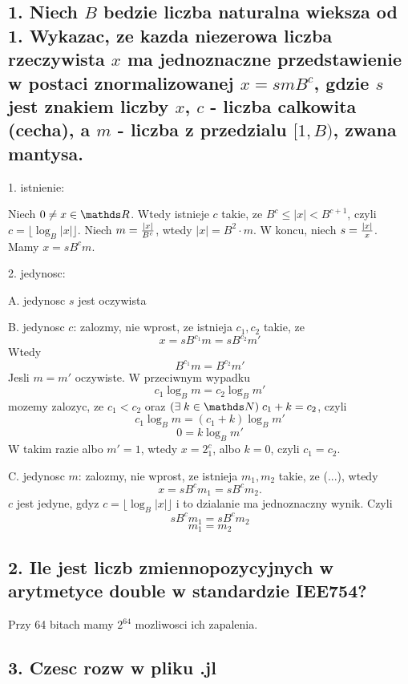 \documentclass{article}[13pt]
\begin{document}
    \subsection*{1. Niech $B$ bedzie liczba naturalna wieksza od 1. Wykazac, ze kazda niezerowa liczba rzeczywista $x$ ma jednoznaczne przedstawienie w postaci znormalizowanej $x=smB^c$, gdzie $s$ jest znakiem liczby $x$, $c$ - liczba calkowita (cecha), a $m$ - liczba z przedzialu $[1, B)$, zwana mantysa.}

    1. istnienie:
    \medskip

    Niech $0\neq x\in\R$. Wtedy istnieje $c$ takie, ze $B^c\leq |x| < B^{c+1}$, czyli $c=\lfloor\log_B |x|\rfloor$. Niech $m={|x|\over B^c}$, wtedy $|x|=B^2\cdot m$. W koncu, niech $s={|x|\over x}$. Mamy $x=sB^cm$.
    \bigskip

    2. jedynosc:
    \medskip

    \indent A. jedynosc $s$ jest oczywista
    \medskip

    \indent B. jedynosc $c$: zalozmy, nie wprost, ze istnieja $c_1, c_2$ takie, ze
    $$x=sB^{c_1}m=sB^{c_2}m'$$
    Wtedy
    $$B^{c_1}m=B^{c_2}m'$$
    Jesli $m=m'$ oczywiste. W przeciwnym wypadku
    $$c_1\log_B m=c_2\log_B m'$$
    mozemy zalozyc, ze $c_1<c_2$ oraz $(\exists\;k\in\N)\;c_1+k=c_2$, czyli
    $$c_1\log_B m=(c_1+k)\log_B m'$$
    $$0 = k\log_B m'$$
    W takim razie albo $m'=1$, wtedy $x=2^c_1$, albo $k=0$, czyli $c_1=c_2$.
    \medskip

    \indent C. jedynosc $m$: zalozmy, nie wprost, ze istnieja $m_1, m_2$ takie, ze (...), wtedy
    $$x=sB^{c}m_1=sB^{c}m_2.$$
    $c$ jest jedyne, gdyz $c=\lfloor \log_B|x|\rfloor$ i to dzialanie ma jednoznaczny wynik. Czyli
    $$sB^cm_1=sB^cm_2$$
    $$m_1=m_2$$

    \kdowod

    \subsection*{2. Ile jest liczb zmiennopozycyjnych w arytmetyce double w standardzie IEE754?}

    Przy 64 bitach mamy $2^{64}$ mozliwosci ich zapalenia. 

    \subsection*{3. Czesc rozw w pliku .jl}
\end{document}
